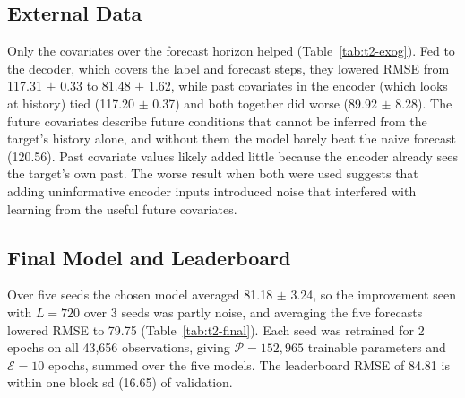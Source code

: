 \documentclass{article}
\begin{document}
\begin{table}[!htbp]
  \centering
  \caption{Validation results when one setting of the future-covariate model is changed, mean $\pm$ sd over 3 seeds. Block sd is the sd of RMSE across the 12 non-overlapping 168-step blocks.}
  \label{tab:t2-arms}
  \resizebox{\linewidth}{!}{}
\end{table}

\begin{table}[!htbp]
  \centering
  \caption{Settings of the final model.}
  \label{tab:t2-settings}
  \small
  
\end{table}

\subsection{External Data}
\label{subsec:t2-exog}

Only the covariates over the forecast horizon helped (Table~\ref{tab:t2-exog}). Fed to the decoder, which covers the label and forecast steps, they lowered RMSE from 117.31 $\pm$ 0.33 to 81.48 $\pm$ 1.62, while past covariates in the encoder (which looks at history) tied (117.20 $\pm$ 0.37) and both together did worse (89.92 $\pm$ 8.28). The future covariates describe future conditions that cannot be inferred from the target's history alone, and without them the model barely beat the naive forecast (120.56). Past covariate values likely added little because the encoder already sees the target's own past. The worse result when both were used suggests that adding uninformative encoder inputs introduced noise that interfered with learning from the useful future covariates.

\begin{table}[!htbp]
  \centering
  \caption{Validation results with and without the optional file ($L = 336$), mean $\pm$ sd over 3 seeds. Past covariates enter the encoder, future covariates the decoder over the label and forecast steps.}
  \label{tab:t2-exog}
  \resizebox{\linewidth}{!}{}
\end{table}

\subsection{Final Model and Leaderboard}
\label{subsec:t2-final}

Over five seeds the chosen model averaged 81.18 $\pm$ 3.24, so the improvement seen with $L = 720$ over 3 seeds was partly noise, and averaging the five forecasts lowered RMSE to 79.75 (Table~\ref{tab:t2-final}). Each seed was retrained for 2 epochs on all 43,656 observations, giving $\mathcal P = 152{,}965$ trainable parameters and $\mathcal E = 10$ epochs, summed over the five models. The leaderboard RMSE of 84.81 is within one block sd (16.65) of validation.
\end{document}

